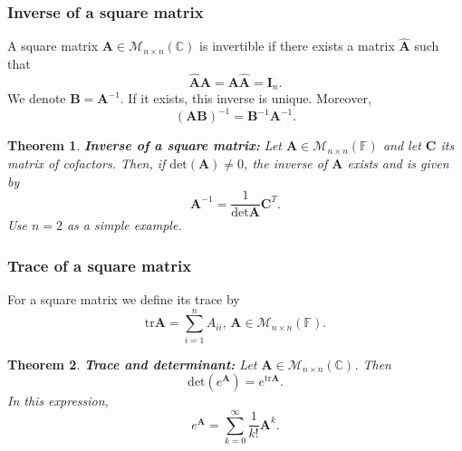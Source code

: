 \documentclass{article}
\newtheorem{theorem}{Theorem}
\begin{document}
\subsubsection{Inverse of a square matrix}
A square matrix $\mathbf{A}\in\mathcal{M}_{n\times n}(\mathbb{C})$ is invertible if there exists a matrix $\mathbf{\hat{A}}$ such that
\begin{equation}
    \mathbf{\hat{A}}\mathbf{A} = \mathbf{A}\mathbf{\hat{A}} = \mathbf{I}_n.
\end{equation}
We denote $\mathbf{B}=\mathbf{A}^{-1}$. If it exists, this inverse is unique. Moreover,
\begin{equation}
    (\mathbf{AB})^{-1} = \mathbf{B}^{-1}\mathbf{A}^{-1}.
\end{equation}
\begin{theorem}
    \textbf{Inverse of a square matrix:} Let $\mathbf{A}\in\mathcal{M}_{n\times n}(\mathbb{F})$ and let $\mathbf{C}$ its matrix of cofactors. Then, if $\text{det}(\mathbf{A})\neq 0$, the inverse of $\mathbf{A}$ exists and is given by
    \begin{equation}
        \mathbf{A}^{-1} = \frac{1}{\text{det}\mathbf{A}}\mathbf{C}^T.
    \end{equation}
    Use $n=2$ as a simple example.
\end{theorem}


\subsubsection{Trace of a square matrix}
For a square matrix we define its trace by
\begin{equation}
    \text{tr}\mathbf{A} = \sum_{i=1}^nA_{ii},\,\mathbf{A}\in\mathcal{M}_{n\times n}(\mathbb{F}).
\end{equation}
\begin{theorem}
    \textbf{Trace and determinant:} Let $\mathbf{A}\in\mathcal{M}_{n\times n}(\mathbb{C})$. Then 
    \begin{equation}
        \text{det}\left(e^{\mathbf{A}}\right) = e^{\text{tr}\mathbf{A}}.
    \end{equation}
    In this expression,
    \begin{equation}
        e^{\mathbf{A}} = \sum_{k=0}^\infty \frac{1}{k!}\mathbf{A}^k.
    \end{equation}
\end{theorem}
\end{document}
